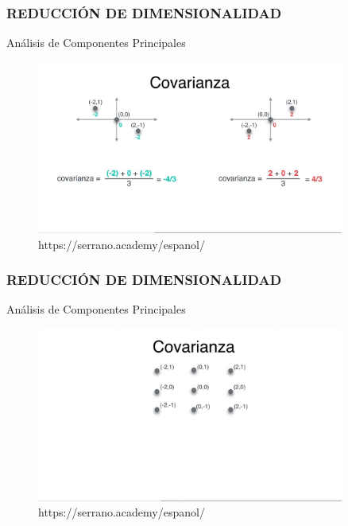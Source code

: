 \documentclass{beamer}
\begin{document}
\begin{frame}
	\frametitle{REDUCCIÓN DE DIMENSIONALIDAD}
	\begin{block}{Análisis de Componentes Principales}	
		\begin{figure}
			\includegraphics[width=0.9\textwidth]{PCA/IMG_3557.jpg}
			\caption{https://serrano.academy/espanol/}
		\end{figure}
	\end{block}
\end{frame}

\begin{frame}
	\frametitle{REDUCCIÓN DE DIMENSIONALIDAD}
	\begin{block}{Análisis de Componentes Principales}	
		\begin{figure}
			\includegraphics[width=0.9\textwidth]{PCA/IMG_3558.jpg}
			\caption{https://serrano.academy/espanol/}
		\end{figure}
	\end{block}
\end{frame}
\end{document}
